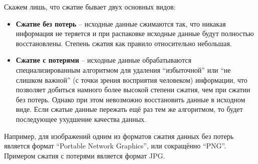 \documentclass[../sparc.tex]{subfiles}
\begin{document}
Скажем лишь, что сжатие бывает двух основных видов:
\begin{itemize}
\item \textbf{Сжатие без потерь} -- исходные данные сжимаются так, что никакая
  информация не теряется и при распаковке исходные данные будут полностью
  восстановлены.  Степень сжатия как правило относительно небольшая.
\item \textbf{Сжатие с потерями} -- исходные данные обрабатываются
  специализированным алгоритмом для удаления ``избыточной'' или ``не слишком
  важной'' (с точки зрения восприятия человеком) информации, что позволяет
  добиться намного более высокой степени сжатия, чем при сжатии без потерь.
  Однако при этом невозможно восстановить данные в исходном виде.  Если сжатые
  данные пережать ещё раз тем же алгоритмом, то будет последующее ухудшение
  качества данных.
\end{itemize}

Например, для изображений одним из форматов сжатия данных без потерь является
формат ``Portable Network Graphics'', или сокращённо ``PNG''.  Примером сжатия с
потерями является формат JPG.
\end{document}
